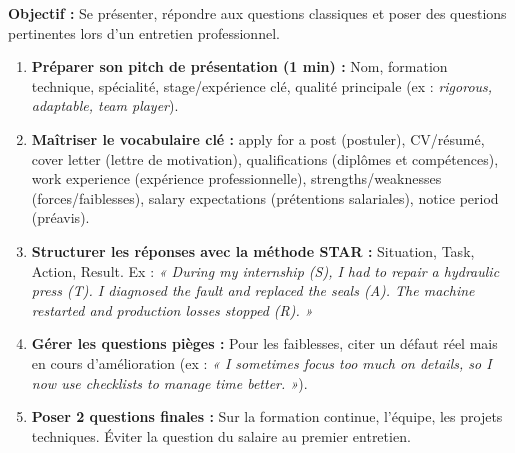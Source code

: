 \documentclass[11pt]{article}
\newcommand{\cle}[1]{{\popxbold\color{popdark}#1}}
\begin{document}
\begin{methode}
\textbf{Objectif :} Se présenter, répondre aux questions classiques et poser des questions pertinentes lors d'un entretien professionnel.
\begin{enumerate}
    \item \textbf{Préparer son \cle{pitch} de présentation (1 min) :} Nom, formation technique, spécialité, stage/expérience clé, qualité principale (ex : \emph{rigorous, adaptable, team player}).
    \item \textbf{Maîtriser le vocabulaire clé :} \cle{apply for a post} (postuler), \cle{CV/résumé}, \cle{cover letter} (lettre de motivation), \cle{qualifications} (diplômes et compétences), \cle{work experience} (expérience professionnelle), \cle{strengths/weaknesses} (forces/faiblesses), \cle{salary expectations} (prétentions salariales), \cle{notice period} (préavis).
    \item \textbf{Structurer les réponses avec la méthode STAR :} \cle{Situation}, \cle{Task}, \cle{Action}, \cle{Result}. Ex : \emph{« During my internship (S), I had to repair a hydraulic press (T). I diagnosed the fault and replaced the seals (A). The machine restarted and production losses stopped (R). »}
    \item \textbf{Gérer les questions pièges :} Pour les faiblesses, citer un défaut réel mais en cours d'amélioration (ex : \emph{« I sometimes focus too much on details, so I now use checklists to manage time better. »}).
    \item \textbf{Poser 2 questions finales :} Sur la formation continue, l'équipe, les projets techniques. Éviter la question du salaire au premier entretien.
\end{enumerate}
\end{methode}
\end{document}
